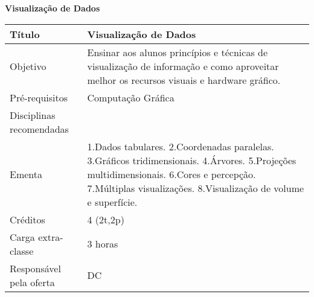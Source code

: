 \textbf{Visualização de Dados}
\begin{center}
\begin{tabular}{|p{4.5cm}|p{10.0cm}|} \hline
Título & Visualização de Dados \\ \hline
Objetivo & Ensinar aos alunos princípios e técnicas de visualização de informação e como aproveitar melhor os recursos visuais e hardware gráfico. \\ \hline
Pré-requisitos &  Computação Gráfica \\ \hline
Disciplinas recomendadas &  \\ \hline
Ementa & 1.Dados tabulares. 2.Coordenadas paralelas. 3.Gráficos tridimensionais. 4.Árvores. 5.Projeções multidimensionais. 6.Cores e percepção. 7.Múltiplas visualizações. 8.Visualização de volume e superfície. 
 \\ \hline
Créditos & 4 (2t,2p) \\ \hline
Carga extra-classe & 3 horas  \\ \hline
Responsável pela oferta & DC \\ \hline
\end{tabular}
\end{center}
